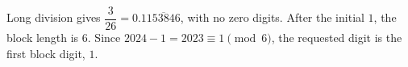 Long division gives $\dfrac{3}{26}=0.1\overline{153846}$, with no zero digits. After the initial $1$, the block length is $6$. Since $2024-1=2023\equiv1\pmod6$, the requested digit is the first block digit, $\boxed1$.
